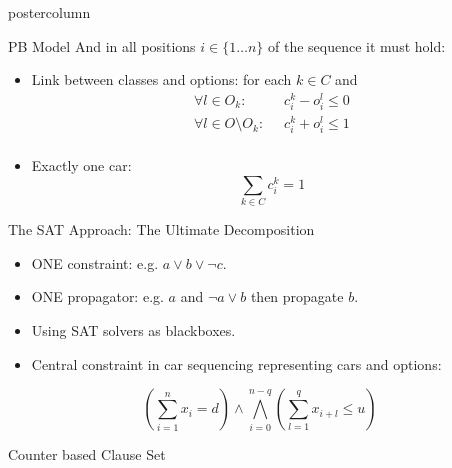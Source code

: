 \documentclass[final]{beamer}
\begin{document}
\begin{frame}
\begin{columns}
\begin{column}{.49\textwidth}
\begin{beamercolorbox}[center,wd=\textwidth]{postercolumn}
\begin{minipage}[T]{.95\textwidth}
{\begin{block}{PB Model}
                And in all positions $i \in \{1\ldots n\}$ of the sequence it must hold:
                
                \begin{itemize}
                    \item Link between classes and options: for each $k\in C$ and 
                        \begin{align*}
                            \forall l \in O_k :\;\; & c^k_i - o^l_i \leq 0 \\
                            \forall l \in O \setminus O_k :\;\; &c^k_i + o^l_i \leq 1\\
                        \end{align*}
                    \item Exactly one car:  $$\sum_{k\in C} c^k_i = 1$$  
                \end{itemize}
            \end{block}
            \vfill
            \begin{block}{The SAT Approach: The Ultimate Decomposition}
                \begin{itemize}
                \itemsep1pt\parskip0pt
                \item
                  ONE constraint: e.g. $a \vee b \vee \neg c$.
                \item
                  ONE propagator: e.g. $a$ and $\neg a \vee b$ then propagate $b$.
                \item
                  Using SAT solvers as blackboxes.
                \item
                  Central constraint in car sequencing representing cars and
options:
                \end{itemize}
                
                \[ (\sum_{i=1}^n x_{i} = d) \wedge \bigwedge_{i=0}^{n-q}(\sum_{l=1}^q x_{i+l} \leq u )\]

            \end{block}
            \vfill
            \begin{block}{Counter based Clause Set}%
                \begin{center}
                                          
\end{center}
\end{block}}
\end{minipage}
\end{beamercolorbox}
\end{column}
\end{columns}
\end{frame}
\end{document}

